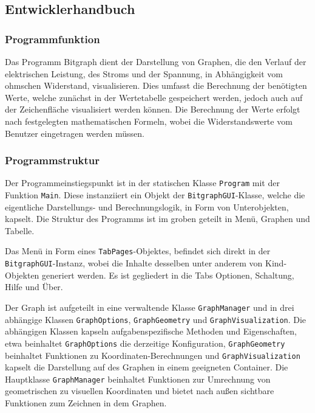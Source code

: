 \documentclass[a4paper]{article}
\begin{document}
\subsection{Entwicklerhandbuch}

    \subsubsection{Programmfunktion}
    Das Programm \glqq Bitgraph\grqq{} dient der Darstellung von Graphen, die den Verlauf der elektrischen Leistung, des Stroms und der Spannung, in Abhängigkeit vom ohmschen Widerstand, visualisieren.
    Dies umfasst die Berechnung der benötigten Werte, welche zunächst in der Wertetabelle gespeichert werden, jedoch auch auf der Zeichenfläche visualisiert werden können.
    Die Berechnung der Werte erfolgt nach festgelegten mathematischen Formeln, wobei die Widerstandswerte vom Benutzer eingetragen werden müssen.

    \subsubsection{Programmstruktur}
    
    Der Programmeinstiegspunkt ist in der statischen Klasse \verb|Program| mit der Funktion \verb|Main|.
    Diese instanziiert ein Objekt der \verb|BitgraphGUI|-Klasse, welche die eigentliche Darstellungs- und Berechnungslogik, in Form von Unterobjekten, kapselt.
    Die Struktur des Programms ist im groben geteilt in Menü, Graphen und Tabelle.

    Das Menü in Form eines \verb|TabPages|-Objektes, befindet sich direkt in der \verb|BitgraphGUI|-Instanz, wobei die Inhalte desselben unter anderem von Kind-Objekten generiert werden.
    Es ist gegliedert in die Tabs \glqq Optionen\grqq{}, \glqq Schaltung\grqq{}, \glqq Hilfe\grqq{} und \glqq Über\grqq{}.
    
    Der Graph ist aufgeteilt in eine verwaltende Klasse \verb|GraphManager| und in drei abhängige Klassen \verb|GraphOptions|, \verb|GraphGeometry| und \verb|GraphVisualization|.
    Die abhängigen Klassen kapseln aufgabenspezifische Methoden und Eigenschaften, etwa beinhaltet \verb|GraphOptions| die derzeitige Konfiguration, \verb|GraphGeometry| beinhaltet Funktionen zu Koordinaten-Berechnungen und \verb|GraphVisualization| kapselt die Darstellung auf des Graphen in einem geeigneten Container.
    Die Hauptklasse \verb|GraphManager| beinhaltet Funktionen zur Umrechnung von geometrischen zu visuellen Koordinaten und bietet nach außen sichtbare Funktionen zum Zeichnen in dem Graphen.
    
\end{document}
